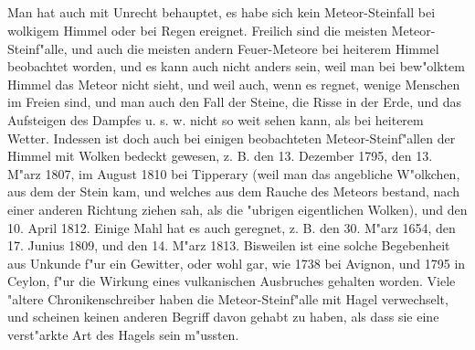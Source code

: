 \documentclass[a4paper, 11pt, oneside, polutonikogreek, german]{article}
\begin{document}
\subsection{}
\paragraph{}
Man hat auch mit Unrecht behauptet, es habe sich kein Meteor-Steinfall bei wolkigem Himmel oder bei Regen ereignet. Freilich sind die meisten Meteor-Steinf"alle, und auch die meisten andern Feuer-Meteore bei heiterem Himmel beobachtet worden, und es kann auch nicht anders sein, weil man bei bew"olktem Himmel das Meteor nicht sieht, und weil auch, wenn es regnet, wenige Menschen im Freien sind, und man auch den Fall der Steine, die Risse in der Erde, und das Aufsteigen des Dampfes u. s. w. nicht so weit sehen kann, als bei heiterem Wetter. Indessen ist doch auch bei einigen beobachteten Meteor-Steinf"allen der Himmel mit Wolken bedeckt gewesen, z. B. den 13. Dezember 1795, den 13. M"arz 1807, im August 1810 bei Tipperary (weil man das angebliche W"olkchen, aus dem der Stein kam, und welches aus dem Rauche des Meteors bestand, nach einer anderen Richtung ziehen sah, als die "ubrigen eigentlichen Wolken), und den 10. April 1812. Einige Mahl hat es auch geregnet, z. B. den 30. M"arz 1654, den 17. Junius 1809, und den 14. M"arz 1813. Bisweilen ist eine solche Begebenheit aus Unkunde f"ur ein Gewitter, oder wohl gar, wie 1738 bei Avignon, und 1795 in Ceylon, f"ur die Wirkung eines vulkanischen Ausbruches gehalten worden. Viele "altere Chronikenschreiber haben die Meteor-Steinf"alle mit Hagel verwechselt, und scheinen keinen anderen Begriff davon gehabt zu haben, als dass sie eine verst"arkte Art des Hagels sein m"ussten.
\subsection{}
\end{document}

